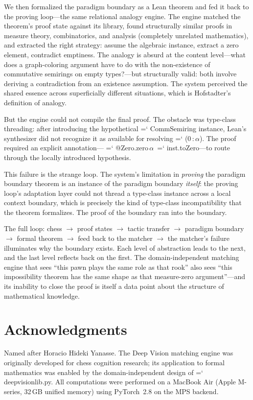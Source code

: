 \documentclass[11pt]{article}
\renewcommand{\texttt}[1]{%
  \begingroup\ttfamily\hyphenchar\font=`\-\relax
  \def\_{\textunderscore\discretionary{}{}{}}%
  #1\endgroup}
\theoremstyle{definition}
\theoremstyle{remark}
\begin{document}
We then formalized the paradigm boundary as a Lean theorem and fed
it back to the proving loop---the same relational analogy engine.
The engine matched the theorem's proof state against its library,
found structurally similar proofs in measure theory, combinatorics,
and analysis (completely unrelated mathematics), and extracted the
right strategy: assume the algebraic instance, extract a zero
element, contradict emptiness.  The analogy is absurd at the
content level---what does a graph-coloring argument have to do
with the non-existence of commutative semirings on empty
types?---but structurally valid: both involve deriving a
contradiction from an existence assumption.  The system perceived
the shared essence across superficially different situations, which
is Hofstadter's definition of analogy.

But the engine could not compile the final proof.  The obstacle was
type-class threading: after introducing the hypothetical
\texttt{CommSemiring} instance, Lean's synthesizer did not
recognize it as available for resolving \texttt{(0\,:\,$\alpha$)}.
The proof required an explicit annotation---\texttt{@Zero.zero}\,$\alpha$\,\texttt{inst.toZero}---to
route through the locally introduced hypothesis.

This failure is the strange loop.  The system's limitation in
\emph{proving} the paradigm boundary theorem is an instance of the
paradigm boundary \emph{itself}: the proving loop's adaptation
layer could not thread a type-class instance across a local
context boundary, which is precisely the kind of type-class
incompatibility that the theorem formalizes.  The proof of the
boundary ran into the boundary.

The full loop: chess $\to$ proof states $\to$ tactic transfer $\to$
paradigm boundary $\to$ formal theorem $\to$ feed back to the
matcher $\to$ the matcher's failure illuminates why the boundary
exists.  Each level of abstraction leads to the next, and the last
level reflects back on the first.  The domain-independent matching
engine that sees ``this pawn plays the same role as that rook''
also sees ``this impossibility theorem has the same shape as that
measure-zero argument''---and its inability to close the proof is
itself a data point about the structure of mathematical knowledge.

\section*{Acknowledgments}

Named after Horacio Hideki Yanasse.  The Deep Vision matching engine
was originally developed for chess cognition research; its application
to formal mathematics was enabled by the domain-independent design of
\texttt{deep\_vision\_lib.py}.  All computations were performed on a
MacBook Air (Apple M-series, 32\,GB unified memory) using PyTorch~2.8
on the MPS backend.
\end{document}
